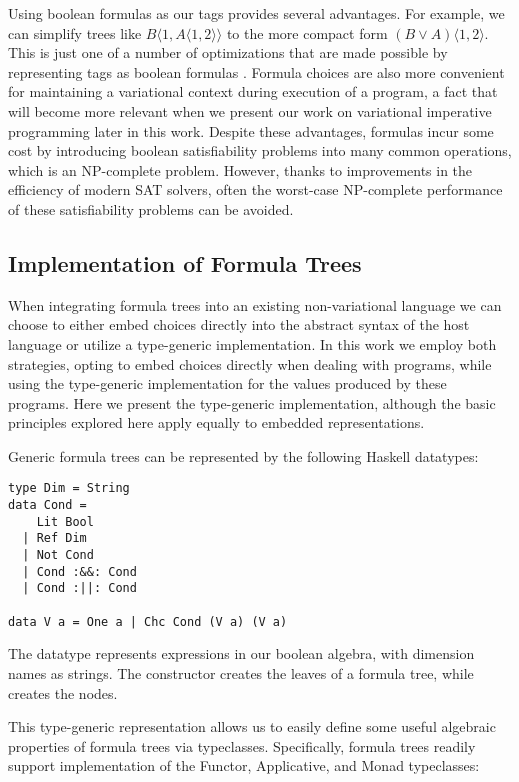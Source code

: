 \documentclass[letterpaper,10pt,onecolumn]{article}
\newcommand{\tagtree}[3]{#1 \langle #2, #3 \rangle}
\begin{document}
Using boolean formulas as our tags provides several advantages. For example, we can simplify trees like
$\tagtree{B}{1}{\tagtree{A}{1}{2}}$ to the more compact form $\tagtree{(B \vee A)}{1}{2}$. This is just
one of a number of optimizations that are made possible by representing tags as boolean formulas
\cite{walkingshaw2014projectional,hubbard2016formula}. Formula choices are also more convenient
for maintaining a variational context during execution of a program, a fact that will become
more relevant when we present our work on variational imperative programming later in
this work. Despite these advantages, formulas incur some cost by introducing boolean
satisfiability problems into many common operations, which is an NP-complete problem. However, thanks to improvements in the
efficiency of modern SAT solvers, often the worst-case NP-complete performance of these satisfiability
problems can be avoided.

\subsection{Implementation of Formula Trees}

When integrating formula trees into an existing non-variational language we can choose to
either embed choices directly into the abstract syntax of the host language or utilize a type-generic
implementation. In this work we employ both strategies, opting to embed choices directly when dealing
with programs, while using the type-generic implementation for the values produced by these programs.
Here we present the type-generic implementation, although the basic principles explored here apply
equally to embedded representations.

Generic formula trees can be represented by the following Haskell datatypes:

\begin{lstlisting}
type Dim = String
data Cond =
    Lit Bool
  | Ref Dim
  | Not Cond
  | Cond :&&: Cond
  | Cond :||: Cond

data V a = One a | Chc Cond (V a) (V a)
\end{lstlisting}

The datatype  represents expressions in our boolean algebra, with dimension names as strings.
The constructor  creates the leaves of a formula tree, while  creates the nodes.

This type-generic representation allows us to easily define some useful algebraic properties of
formula trees via typeclasses. Specifically, formula trees readily support implementation of the
Functor, Applicative, and Monad typeclasses:
\end{document}

